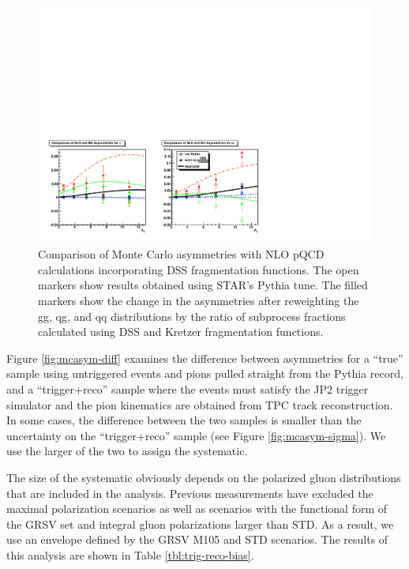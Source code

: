 \begin{figure}
  \includegraphics[width=\textwidth]{figures/compare-mcasym-nlo}
  \caption{Comparison of Monte Carlo asymmetries with NLO pQCD calculations
  incorporating DSS fragmentation functions. The open markers show results
  obtained using STAR's Pythia tune. The filled markers show the change in the
  asymmetries after reweighting the gg, qg, and qq distributions by the ratio
  of subprocess fractions calculated using DSS and Kretzer fragmentation
  functions.}
  \label{fig:compare-mcasym-nlo}
\end{figure}

Figure \ref{fig:mcasym-diff} examines the difference between asymmetries for a
``true'' sample using untriggered events and pions pulled straight from the
Pythia record, and a ``trigger+reco'' sample where the events must satisfy the
JP2 trigger simulator and the pion kinematics are obtained from TPC track
reconstruction. In some cases, the difference between the two samples is
smaller than the uncertainty on the ``trigger+reco'' sample (see Figure
\ref{fig:mcasym-sigma}). We use the larger of the two to assign the
systematic.

The size of the systematic obviously depends on the polarized gluon
distributions that are included in the analysis. Previous measurements have
excluded the maximal polarization scenarios as well as scenarios with the
functional form of the GRSV set and integral gluon polarizations larger than
STD. As a result, we use an envelope defined by the GRSV M105 and STD
scenarios. The results of this analysis are shown in Table
\ref{tbl:trig-reco-bias}.

